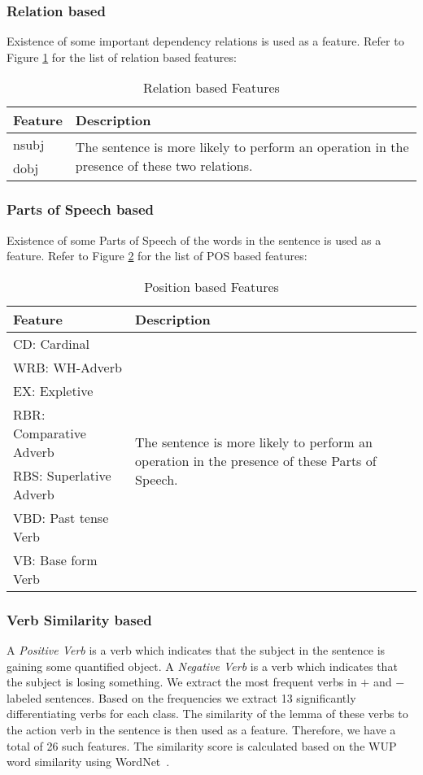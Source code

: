 \documentclass[11pt]{article}
\begin{document}
\subsubsection{Relation based}
Existence of some important dependency relations is used as a feature. Refer to Figure \ref{figure:9} for the list of relation based features:
\begin{table}[H]
\begin{tabular}{|m{2cm} | m{5cm}|}
\hline 
\textbf{Feature} & \textbf{Description}\\ \hline
nsubj & \multirow{2}{5cm}{\centering The sentence is more likely to perform an operation in the presence of these two relations.} \\[10pt]
\cline{1-1} 
 dobj & \\[10pt]
\hline
\end{tabular}
\caption{Relation based Features}
\label{figure:9}
\end{table}

\subsubsection{Parts of Speech based}
Existence of some Parts of Speech of the words in the sentence is used as a feature. Refer to Figure \ref{figure:10} for the list of POS based features:

\begin{table}[H]
\centering
\begin{tabular}{ | m{3cm} | m{4cm} |}
\hline
\textbf{Feature} & \textbf{Description}\\ \hline
CD: Cardinal & \multirow{8}{4cm}{\centering The sentence is more likely to perform an operation in the presence of these Parts of Speech.} \\
\cline{1-1} 
WRB: WH-Adverb & \\
\cline{1-1} 
EX: Expletive & \\ 
\cline{1-1} 
RBR: Comparative Adverb & \\ 
\cline{1-1} 
RBS: Superlative Adverb & \\ 
\cline{1-1} 
VBD: Past tense Verb & \\ 
\cline{1-1} 
VB: Base form Verb & \\ 
\hline
\end{tabular}
\caption{Position based Features}
\label{figure:10}
\end{table}

\subsubsection{Verb Similarity based}
A \textit{Positive Verb} is a verb which indicates that the subject in the sentence is gaining some quantified object. A \textit{Negative Verb} is a verb which indicates that the subject is losing something. We extract the most frequent verbs in  $\mathit{+}$ and $\mathit{-}$ labeled sentences. Based on the frequencies we extract 13 significantly differentiating verbs for each class. The similarity of the lemma of these verbs to the action verb in the sentence is then used as a feature. Therefore, we have a total of 26 such features. The similarity score is calculated based on the WUP word similarity using WordNet~\cite{WordNet:95}.
\end{document}
